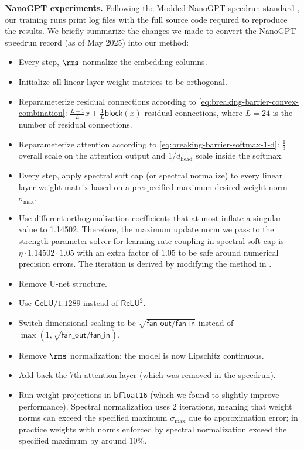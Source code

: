 \textbf{NanoGPT experiments.} Following the Modded-NanoGPT speedrun standard \citep{modded_nanogpt_2024}, our training runs print log files with the full source code required to reproduce the results. We briefly summarize the changes we made to convert the NanoGPT speedrun record (as of May 2025) into our method:
\begin{itemize}
    \item Every step, $\rms$ normalize the embedding columns.
    \item Initialize all linear layer weight matrices to be orthogonal.
    \item Reparameterize residual connections according to \cref{eq:breaking-barrier-convex-combination}: $\tfrac{L-1}{L} x + \tfrac{1}{L} \mathsf{block}(x)$ residual connections, where $L = 24$ is the number of residual connections.
    \item Reparameterize attention according to \cref{eq:breaking-barrier-softmax-1-d}: $\tfrac13$ overall scale on the attention output and $1/d_\text{head}$ scale inside the softmax.
    \item Every step, apply spectral soft cap (or spectral normalize) to every linear layer weight matrix based on a prespecified maximum desired weight norm $\sigma_\text{max}$.
    \item Use different orthogonalization coefficients that at most inflate a singular value to 1.14502. Therefore, the maximum update norm we pass to the strength parameter solver for learning rate coupling in spectral soft cap is $\eta \cdot 1.14502 \cdot 1.05$ with an extra factor of $1.05$ to be safe around numerical precision errors. The iteration is derived by modifying the method in \citep{cesista2025muonoptcoeffs}.
    \item Remove U-net structure.
    \item Use $\mathsf{GeLU} / 1.1289$ instead of $\mathsf{ReLU}^2$.
    \item Switch dimensional scaling to be $\sqrt{\mathsf{fan\_{out}} / \mathsf{fan\_{in}}}$ instead of $\max(1, \sqrt{\mathsf{fan\_out} / \mathsf{fan\_in}})$.
    \item Remove $\rms$ normalization: the model is now Lipschitz continuous.
    \item Add back the 7th attention layer (which was removed in the speedrun).
    \item Run weight projections in \verb|bfloat16| (which we found to slightly improve performance). Spectral normalization uses 2 iterations, meaning that weight norms can exceed the specified maximum $\sigma_\text{max}$ due to approximation error; in practice weights with norms enforced by spectral normalization exceed the specified maximum by around 10\%.
\end{itemize}